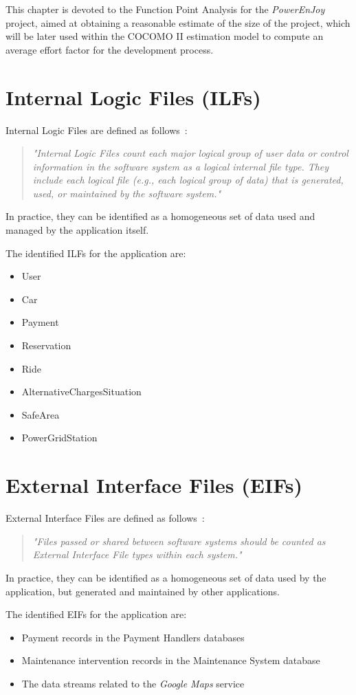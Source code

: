 This chapter is devoted to the Function Point Analysis for the \textit{PowerEnJoy} project, aimed at obtaining a reasonable estimate of the size of the project, which will be later used within the COCOMO II estimation model to compute an average effort factor for the development process.

\section{Internal Logic Files (ILFs)}
Internal Logic Files are defined as follows~\cite{cocomo-manual}:
\begin{quotation}
\textit{"Internal Logic Files count each major logical group of user data or control information in the software system as a logical internal file type. They include each logical file (e.g., each logical group of data) that is generated, used, or maintained by the software system."}
\end{quotation}
\noindent
In practice, they can be identified as a homogeneous set of data used and managed by the application itself.

The identified ILFs for the application are:
\begin{itemize}
\item User
\item Car
\item Payment
\item Reservation
\item Ride
\item AlternativeChargesSituation
\item SafeArea
\item PowerGridStation
\end{itemize}

\section{External Interface Files (EIFs)}
External Interface Files are defined as follows~\cite{cocomo-manual}:
\begin{quotation}
\textit{"Files passed or shared between software systems should be counted as External Interface File types within each system."}
\end{quotation}
In practice, they can be identified as a homogeneous set of data used by the application, but generated and maintained by other applications.

The identified EIFs for the application are:
\begin{itemize}
\item Payment records in the Payment Handlers databases
\item Maintenance intervention records in the Maintenance System database
\item The data streams related to the \textit{Google Maps} service
\end{itemize}

